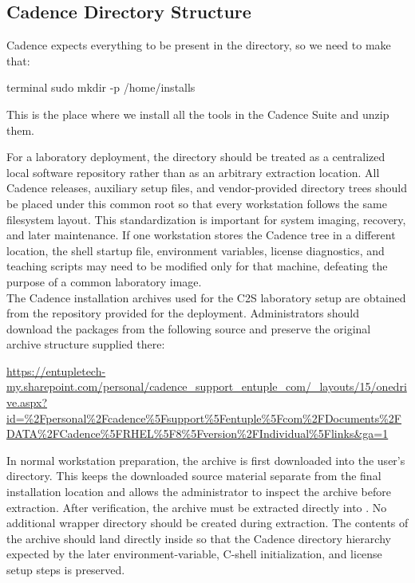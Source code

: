 \subsection{Cadence Directory Structure}
Cadence expects everything to be present in the  directory, so we need to make that: 


\begin{codeblock}{terminal}
sudo mkdir -p /home/installs
\end{codeblock}

This is the place where we install all the tools in the Cadence Suite and unzip them. 

For a laboratory deployment, the  directory should be treated as a
centralized local software repository rather than as an arbitrary extraction location. All Cadence
releases, auxiliary setup files, and vendor-provided directory trees should be placed under this
common root so that every workstation follows the same filesystem layout. This standardization is
important for system imaging, recovery, and later maintenance. If one workstation stores the Cadence
tree in a different location, the shell startup file, environment variables, license diagnostics, and
teaching scripts may need to be modified only for that machine, defeating the purpose of a common
laboratory image.\\

\noindent The Cadence installation archives used for the C2S laboratory setup are obtained from the
repository provided for the deployment. Administrators should download the packages from the
following source and preserve the original archive structure supplied there:

\begin{center}
\small\url{https://entupletech-my.sharepoint.com/personal/cadence_support_entuple_com/_layouts/15/onedrive.aspx?id=%2Fpersonal%2Fcadence%5Fsupport%5Fentuple%5Fcom%2FDocuments%2FDATA%2FCadence%5FRHEL%5F8%5Fversion%2FIndividual%5Flinks&ga=1}
\end{center}

\noindent In normal workstation preparation, the archive is first downloaded into the user's
 directory. This keeps the downloaded source material separate from the
final installation location and allows the administrator to inspect the archive before extraction.
After verification, the archive must be extracted directly into . No
additional wrapper directory should be created during extraction. The contents of the archive should
land directly inside  so that the Cadence directory hierarchy expected
by the later environment-variable, C-shell initialization, and license setup steps is preserved.\\

